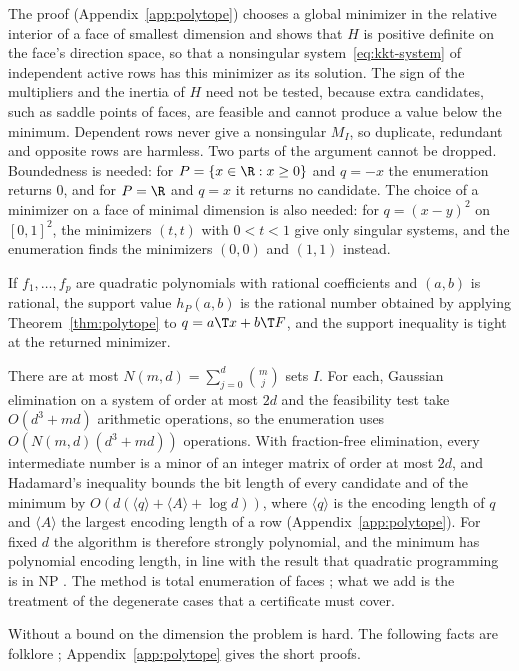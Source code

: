 The proof (Appendix~\ref{app:polytope}) chooses a global minimizer in the
relative interior of a face of smallest dimension and shows that $H$ is
positive definite on the face's direction space, so that a nonsingular
system~\eqref{eq:kkt-system} of independent active rows has this minimizer
as its solution. The sign of the multipliers and the inertia of $H$ need not
be tested, because extra candidates, such as saddle points of faces, are
feasible and cannot produce a value below the minimum. Dependent rows never
give a nonsingular $M_I$, so duplicate, redundant and opposite rows are
harmless. Two parts of the argument cannot be dropped. Boundedness is needed:
for $P=\{x\in\R:x\ge0\}$ and $q=-x$ the enumeration returns $0$, and for
$P=\R$ and $q=x$ it returns no candidate. The choice of a minimizer on a face
of minimal dimension is also needed: for $q=(x-y)^2$ on $[0,1]^2$, the
minimizers $(t,t)$ with $0<t<1$ give only singular systems, and the
enumeration finds the minimizers $(0,0)$ and $(1,1)$ instead.

\begin{corollary}\label{cor:quad-features}
If $f_1,\dots,f_p$ are quadratic polynomials with rational coefficients and
$(a,b)$ is rational, the support value $h_P(a,b)$ is the rational number
obtained by applying Theorem~\ref{thm:polytope} to $q=a\T x+b\T F$, and the
support inequality is tight at the returned minimizer.
\end{corollary}

There are at most $N(m,d)=\sum_{j=0}^d\binom mj$ sets $I$. For each,
Gaussian elimination on a system of order at most $2d$ and the feasibility
test take $O(d^3+md)$ arithmetic operations, so the enumeration uses
$O(N(m,d)(d^3+md))$ operations. With fraction-free elimination, every
intermediate number is a minor of an integer matrix of order at most $2d$,
and Hadamard's inequality bounds the bit length of every candidate and of
the minimum by $O(d(\langle q\rangle+\langle A\rangle+\log d))$, where
$\langle q\rangle$ is the encoding length of $q$ and $\langle A\rangle$ the
largest encoding length of a row (Appendix~\ref{app:polytope}). For fixed
$d$ the algorithm is therefore strongly polynomial, and the minimum has
polynomial encoding length, in line with the result that quadratic
programming is in NP \citep{Vavasis1990}. The method is total enumeration of
faces \citep[Section~2.9]{Murty1997}; what we add is the treatment of the
degenerate cases that a certificate must cover.

Without a bound on the dimension the problem is hard. The following facts
are folklore \citep[Section~2.3]{BurerLetchford2009}; Appendix~\ref{app:polytope}
gives the short proofs.

